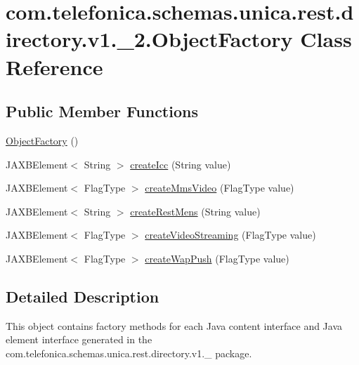 \hypertarget{classcom_1_1telefonica_1_1schemas_1_1unica_1_1rest_1_1directory_1_1v1_1_1__2_1_1ObjectFactory}{
\section{com.telefonica.schemas.unica.rest.directory.v1.\_\-2.ObjectFactory Class Reference}
\label{classcom_1_1telefonica_1_1schemas_1_1unica_1_1rest_1_1directory_1_1v1_1_1__2_1_1ObjectFactory}
}
\subsection*{Public Member Functions}
\begin{DoxyCompactItemize}
\item 
\hyperlink{classcom_1_1telefonica_1_1schemas_1_1unica_1_1rest_1_1directory_1_1v1_1_1__2_1_1ObjectFactory_afee31b08b0d9348339872242b9d4713a}{ObjectFactory} ()
\item 
JAXBElement$<$ String $>$ \hyperlink{classcom_1_1telefonica_1_1schemas_1_1unica_1_1rest_1_1directory_1_1v1_1_1__2_1_1ObjectFactory_a8f05ec546f33008487a6d544a923fe0b}{createIcc} (String value)
\item 
JAXBElement$<$ FlagType $>$ \hyperlink{classcom_1_1telefonica_1_1schemas_1_1unica_1_1rest_1_1directory_1_1v1_1_1__2_1_1ObjectFactory_a187499d991cdb73a837c824d35ad890e}{createMmsVideo} (FlagType value)
\item 
JAXBElement$<$ String $>$ \hyperlink{classcom_1_1telefonica_1_1schemas_1_1unica_1_1rest_1_1directory_1_1v1_1_1__2_1_1ObjectFactory_ac870b2a9717db338a7002f21a0c703b5}{createRestMens} (String value)
\item 
JAXBElement$<$ FlagType $>$ \hyperlink{classcom_1_1telefonica_1_1schemas_1_1unica_1_1rest_1_1directory_1_1v1_1_1__2_1_1ObjectFactory_ab8bbcf550728b9f72d0af26b46846514}{createVideoStreaming} (FlagType value)
\item 
JAXBElement$<$ FlagType $>$ \hyperlink{classcom_1_1telefonica_1_1schemas_1_1unica_1_1rest_1_1directory_1_1v1_1_1__2_1_1ObjectFactory_a535c0c6eb6e9c1a59fd023c9eea492b5}{createWapPush} (FlagType value)
\end{DoxyCompactItemize}


\subsection{Detailed Description}
This object contains factory methods for each Java content interface and Java element interface generated in the com.telefonica.schemas.unica.rest.directory.v1.\_ package. 

